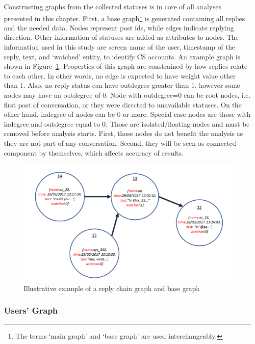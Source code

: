 \documentclass[sigconf]{acmart}
\begin{document}
Constructing graphs from the collected statuses is in core of all
analyses presented in this chapter. First, a base graph\footnote{The
terms `main graph' and `base graph' are used interchangeably.} is
generated containing all replies and the needed data. Nodes represent
post ids, while edges indicate replying direction. Other information
of statuses are added as attributes to nodes. The information used in
this study are screen name of the user, timestamp of the reply, text,
and `watched' entity, to identify CS accounts. An example graph is
shown in Figure~\ref{fig:replychaingraph}. Properties of this graph
are constrained by how replies relate to each other. In other words,
no edge is expected to have weight value other than 1. Also, no reply
status can have outdegree greater than 1, however some nodes may have
an outdegree of 0. Node with outdegree=0 can be root nodes, i.e. first
post of conversation, or they were directed to unavailable
statuses. On the other hand, indegree of nodes can be 0 or
more. Special case nodes are those with indegree and outdegree equal
to 0. Those are isolated/floating nodes and must be removed before
analysis starts. First, those nodes do not benefit the analysis as
they are not part of any conversation. Second, they will be seen as
connected component by themselves, which affects accuracy of results.

\begin{figure}[htb]
\centering
\includegraphics[width=\columnwidth]{images/replychaingraph.png}
\caption{Illustrative example of a reply chain graph and base graph}
\label{fig:replychaingraph}
\end{figure}

\subsubsection{Users' Graph}
\end{document}
